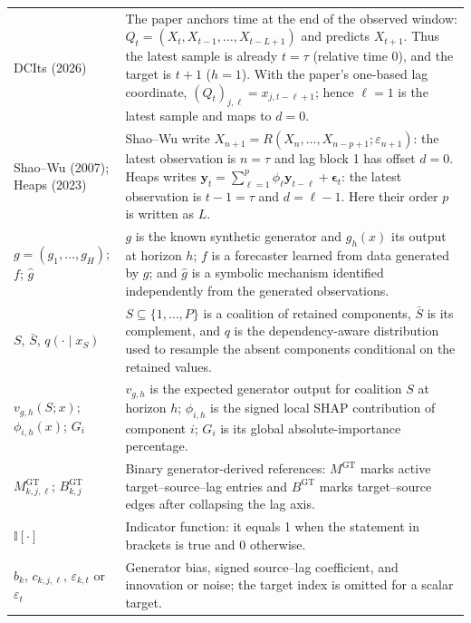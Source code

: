 \begin{longtable}{@{}
>{\raggedright\arraybackslash}p{}
>{\raggedright\arraybackslash}p{}@{}}
DCIts (2026) &
The paper anchors time at the end of the observed window:
$Q_t=(X_t,X_{t-1},\ldots,X_{t-L+1})$ and predicts $X_{t+1}$. Thus the latest
sample is already $t=\tau$ (relative time 0), and the target is $t+1$
($h=1$). With the paper's one-based lag coordinate,
$(Q_t)_{j,\ell}=x_{j,t-\ell+1}$; hence $\ell=1$ is the latest sample and maps
to $d=0$. \\

Shao--Wu (2007); Heaps (2023) &
Shao--Wu write $X_{n+1}=R(X_n,\ldots,X_{n-p+1};\varepsilon_{n+1})$:
the latest observation is $n=\tau$ and lag block 1 has offset $d=0$.
Heaps writes $\mathbf y_t=\sum_{\ell=1}^{p}\phi_\ell\mathbf y_{t-\ell}
+\boldsymbol\epsilon_t$: the latest observation is $t-1=\tau$ and
$d=\ell-1$. Here their order $p$ is written as $L$. \\

$g=(g_1,\ldots,g_H)$; $f$; $\widehat g$ &
$g$ is the known synthetic generator and $g_h(x)$ its output at horizon $h$;
$f$ is a forecaster learned from data generated by $g$; and $\widehat g$ is a
symbolic mechanism identified independently from the generated observations. \\

$S$, $\bar S$, $q(\cdot\mid x_S)$ &
$S\subseteq\{1,\ldots,P\}$ is a coalition of retained components, $\bar S$ is
its complement, and $q$ is the dependency-aware distribution used to resample
the absent components conditional on the retained values. \\

$v_{g,h}(S;x)$; $\phi_{i,h}(x)$; $G_i$ &
$v_{g,h}$ is the expected generator output for coalition $S$ at horizon $h$;
$\phi_{i,h}$ is the signed local SHAP contribution of component $i$; $G_i$ is
its global absolute-importance percentage. \\

$M^{\mathrm{GT}}_{k,j,\ell}$; $B^{\mathrm{GT}}_{k,j}$ &
Binary generator-derived references: $M^{\mathrm{GT}}$ marks active
target--source--lag entries and $B^{\mathrm{GT}}$ marks target--source edges
after collapsing the lag axis. \\

$\mathbb{I}[\cdot]$ &
Indicator function: it equals 1 when the statement in brackets is true and 0
otherwise. \\

$b_k$, $c_{k,j,\ell}$, $\varepsilon_{k,t}$ or $\varepsilon_t$ &
Generator bias, signed source--lag coefficient, and innovation or noise; the
target index is omitted for a scalar target. \\


\end{longtable}
